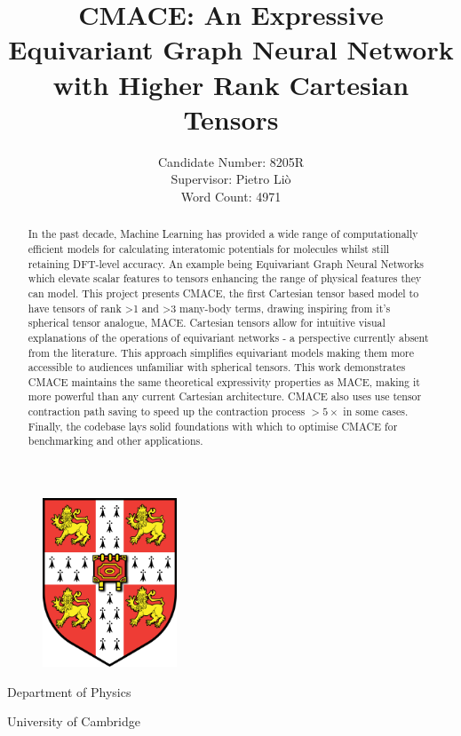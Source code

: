 \documentclass[11pt,a4paper]{article}
\title{CMACE: An Expressive Equivariant Graph Neural Network with Higher Rank Cartesian Tensors}
\author{Candidate Number: 8205R\\
Supervisor: Pietro Li\`o\\
Word Count: 4971}
\begin{document}
\maketitle


\begin{figure}[h]
    \centering
    \includegraphics[width=40mm]{figures/cambridge_logo.png}
\end{figure}

\begin{center}
    Department of Physics
    
    University of Cambridge
\end{center}

\bigskip
\medskip

\begin{abstract}
\centering
In the past decade, Machine Learning has provided a wide range of computationally efficient models for calculating interatomic potentials for molecules whilst still retaining DFT-level accuracy. An example being Equivariant Graph Neural Networks which elevate scalar features to tensors enhancing the range of physical features they can model. This project presents CMACE, the first Cartesian tensor based model to have tensors of rank >1 and >3 many-body terms, drawing inspiring from it's spherical tensor analogue, MACE. Cartesian tensors allow for intuitive visual explanations of the operations of equivariant networks - a perspective currently absent from the literature. This approach simplifies equivariant models making them more accessible to audiences unfamiliar with spherical tensors. This work demonstrates CMACE maintains the same theoretical expressivity properties as MACE, making it more powerful than any current Cartesian architecture. CMACE also uses use tensor contraction path saving to speed up the contraction process $>5\times$ in some cases. Finally, the codebase lays solid foundations with which to optimise CMACE for benchmarking and other applications. 

\end{abstract}
\end{document}

